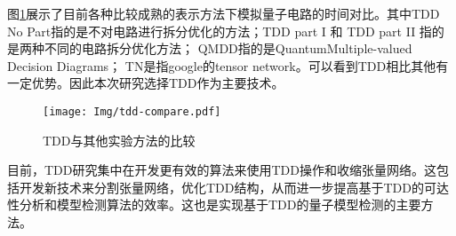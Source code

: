
 
图\ref{fig:tdd-compare}展示了目前各种比较成熟的表示方法下模拟量子电路的时间对比。其中TDD No Part指的是不对电路进行拆分优化的方法；TDD part I 和 TDD part II 指的是两种不同的电路拆分优化方法；
QMDD指的是QuantumMultiple-valued Decision Diagrams；
TN是指google的tensor network。可以看到TDD相比其他有一定优势。因此本次研究选择TDD作为主要技术。

\begin{figure}[!htbp]
    \centering
    \texttt{[image: Img/tdd-compare.pdf]}
    \caption{TDD与其他实验方法的比较\citep{Hong_2022}}
    \label{fig:tdd-compare}
\end{figure}

目前，TDD研究集中在开发更有效的算法来使用TDD操作和收缩张量网络。这包括开发新技术来分割张量网络，优化TDD结构，从而进一步提高基于TDD的可达性分析和模型检测算法的效率。这也是实现基于TDD的量子模型检测的主要方法。

